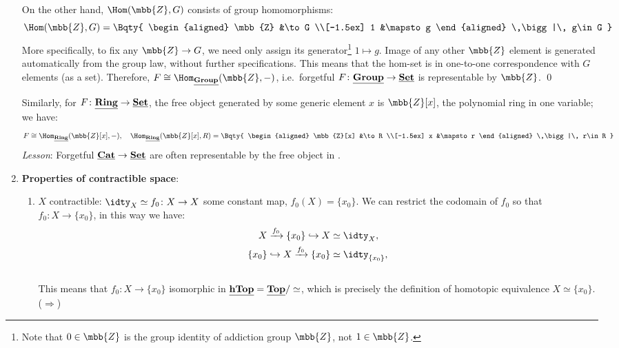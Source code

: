 \documentclass[a4paper,10pt]{article}
\begin{document}
\begin{enumerate}
	On the other hand, $\Hom(\mbb{Z},G)$ consists of group homomorphisms:
	\begin{equation}
		\Hom(\mbb{Z},G)
		= \Bqty{
			\begin{aligned}
				\mbb{Z} &\to G \\[-1.5ex]
				1 &\mapsto g
			\end{aligned}
			\,\bigg|\,
			g\in G
		}
	\end{equation}
	More specifically, to fix any $\mbb{Z}\to G$, we need only assign its generator\footnote{
		Note that $0\in\mbb{Z}$ is the group identity of addiction group $\mbb{Z}$, not $1\in\mbb{Z}$. 
	} $1\mapsto g$. Image of any other $\mbb{Z}$ element is generated automatically from the group law, without further specifications. This means that the hom-set is in one-to-one correspondence with $G$ elements (as a set). Therefore, $F\cong\Hom_{\Cat{Group}}(\mbb{Z},-)$, i.e.\ forgetful $F\colon\underline{\mathbf{Group}}\to\underline{\mathbf{Set}}$ is representable by $\mbb{Z}$. \qed
\pagebreak[3]
	
	Similarly, for $F\colon \underline{\mathbf{Ring}}\to\underline{\mathbf{Set}}$, the free object generated by some generic element $x$ is $\mbb{Z}[x]$, the polynomial ring in one variable; we have:
	\begin{equation}
		F\cong\Hom_{\Cat{Ring}}(\mbb{Z}[x],-),\quad
		\Hom_{\Cat{Ring}}(\mbb{Z}[x],R)
		= \Bqty{
			\begin{aligned}
				\mbb{Z}[x] &\to R \\[-1.5ex]
				x &\mapsto r
			\end{aligned}
			\,\bigg|\,
			r\in R
		}
	\end{equation}
	\textit{Lesson}: Forgetful $\underline{\mathbf{Cat}} \to \underline{\mathbf{Set}}$ are often representable by the free object in . \qedfull
	
	\item \textbf{Properties of contractible space}:
	
	\begin{enumerate}
	\item $X$ contractible: $\idty_X \simeq f_0\colon X\to X$ some constant map, $f_0(X) = \{x_0\}$. We can restrict the codomain of $f_0$ so that $f_0\colon X\to\{x_0\}$, in this way we have:
	\begin{subequations}
	\renewcommand{\theequation}{\theparentequation.\arabic{equation}}
	\begin{align}
		X\xrightarrow{f_0} \{x_0\}
			\hookrightarrow X
		&\simeq \idty_X,
		\label{eq:homotopy_on_X}\\
		\{x_0\}\hookrightarrow X
			\xrightarrow{f_0} \{x_0\}
		&\simeq \idty_{\{x_0\}},
	\end{align}
	\label{eq:homotopic_equiv}
	\end{subequations}
	\\[-\baselineskip]
	This means that $f_0\colon X\to\{x_0\}$ isomorphic in $\underline{\mathbf{hTop}} = \underline{\mathbf{Top}}/\simeq$, which is precisely the definition of homotopic equivalence $X\simeq\{x_0\}$. ($\Rightarrow$)
	

\end{enumerate}
\end{enumerate}
\end{document}

